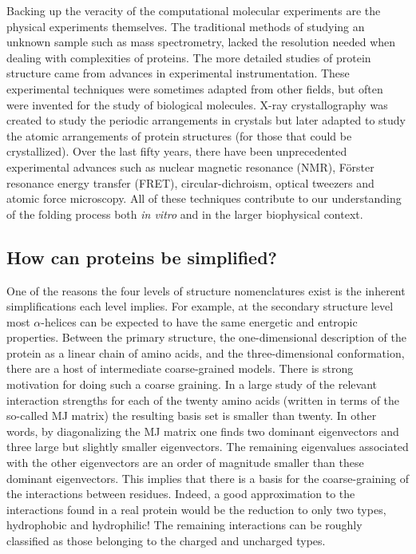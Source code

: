 Backing up the veracity of the computational molecular experiments are the physical experiments themselves. The traditional methods of studying an unknown sample such as mass spectrometry, lacked the resolution needed when dealing with complexities of proteins. The more detailed studies of protein structure came from advances in experimental instrumentation. These experimental techniques were sometimes adapted from other fields, but often were invented for the study of biological molecules. X-ray crystallography was created to study the periodic arrangements in crystals but later adapted to study the atomic arrangements of protein structures (for those that could be crystallized). Over the last fifty years, there have been unprecedented experimental advances such as nuclear magnetic resonance (NMR), F\"{o}rster resonance energy transfer (FRET), circular-dichroism, optical tweezers and atomic force microscopy. All of these techniques contribute to our understanding of the folding process both \textit{in vitro} and in the larger biophysical context.

\subsection{How can proteins be simplified?}

One of the reasons the four levels of structure nomenclatures exist is the inherent simplifications each level implies.  For example, at the secondary structure level most $\alpha$-helices can be expected to have the same energetic and entropic properties. Between the primary structure, the one-dimensional description of the protein as a linear chain of amino acids, and the three-dimensional conformation, there are a host of intermediate coarse-grained models. There is strong motivation for doing such a coarse graining. In a large study of the relevant interaction strengths for each of the twenty amino acids (written in terms of the so-called MJ matrix\cite{miyazawa_estimation_1985}) the resulting basis set is smaller than twenty. In other words, by diagonalizing the MJ matrix one finds two dominant eigenvectors and three large but slightly smaller eigenvectors. The remaining eigenvalues associated with the other eigenvectors are an order of magnitude smaller than these dominant eigenvectors. This implies that there is a basis for the coarse-graining of the interactions between residues. Indeed, a good approximation to the interactions found in a real protein would be the reduction to only two types, hydrophobic and hydrophilic!\cite{dill_theory_1985} The remaining interactions can be roughly classified as those belonging to the charged and uncharged types.


